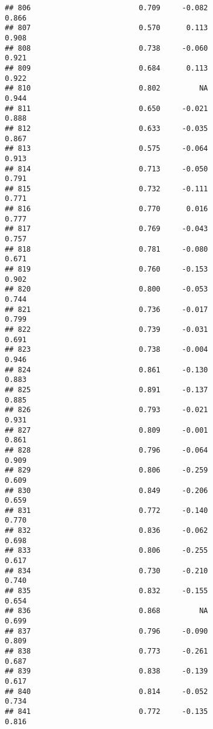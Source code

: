 \documentclass[
]{article}
\begin{document}
\begin{verbatim}
## 806                         0.709     -0.082                     0.866
## 807                         0.570      0.113                     0.908
## 808                         0.738     -0.060                     0.921
## 809                         0.684      0.113                     0.922
## 810                         0.802         NA                     0.944
## 811                         0.650     -0.021                     0.888
## 812                         0.633     -0.035                     0.867
## 813                         0.575     -0.064                     0.913
## 814                         0.713     -0.050                     0.791
## 815                         0.732     -0.111                     0.771
## 816                         0.770      0.016                     0.777
## 817                         0.769     -0.043                     0.757
## 818                         0.781     -0.080                     0.671
## 819                         0.760     -0.153                     0.902
## 820                         0.800     -0.053                     0.744
## 821                         0.736     -0.017                     0.799
## 822                         0.739     -0.031                     0.691
## 823                         0.738     -0.004                     0.946
## 824                         0.861     -0.130                     0.883
## 825                         0.891     -0.137                     0.885
## 826                         0.793     -0.021                     0.931
## 827                         0.809     -0.001                     0.861
## 828                         0.796     -0.064                     0.909
## 829                         0.806     -0.259                     0.609
## 830                         0.849     -0.206                     0.659
## 831                         0.772     -0.140                     0.770
## 832                         0.836     -0.062                     0.698
## 833                         0.806     -0.255                     0.617
## 834                         0.730     -0.210                     0.740
## 835                         0.832     -0.155                     0.654
## 836                         0.868         NA                     0.699
## 837                         0.796     -0.090                     0.809
## 838                         0.773     -0.261                     0.687
## 839                         0.838     -0.139                     0.617
## 840                         0.814     -0.052                     0.734
## 841                         0.772     -0.135                     0.816

\end{verbatim}
\end{document}
